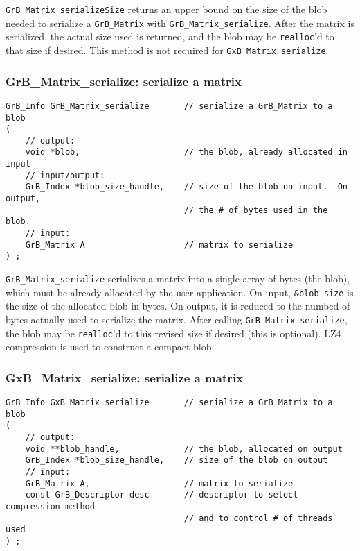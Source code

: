 \documentclass[12pt]{article}
\begin{document}
{\verb'GrB_Matrix_serializeSize' returns an upper bound on the size of the blob
needed to serialize a \verb'GrB_Matrix' with \verb'GrB_Matrix_serialize'.
After the matrix is serialized, the actual size used is returned, and the blob
may be \verb'realloc''d to that size if desired.
This method is not required for \verb'GxB_Matrix_serialize'.

\newpage
\subsubsection{{\sf GrB\_Matrix\_serialize:}      serialize a matrix}
\label{matrix_serialize}

\begin{mdframed}[userdefinedwidth=6in]
{\footnotesize
\begin{verbatim}
GrB_Info GrB_Matrix_serialize       // serialize a GrB_Matrix to a blob
(
    // output:
    void *blob,                     // the blob, already allocated in input
    // input/output:
    GrB_Index *blob_size_handle,    // size of the blob on input.  On output,
                                    // the # of bytes used in the blob.
    // input:
    GrB_Matrix A                    // matrix to serialize
) ;
\end{verbatim}
} \end{mdframed}

\verb'GrB_Matrix_serialize' serializes a matrix into a single array of bytes
(the blob), which must be already allocated by the user application.
On input, \verb'&blob_size' is the size of the allocated blob in bytes.
On output, it is reduced to the numbed of bytes actually used to serialize
the matrix.  After calling \verb'GrB_Matrix_serialize', the blob may be
\verb'realloc''d to this revised size if desired (this is optional).
LZ4 compression is used to construct a compact blob.

\subsubsection{{\sf GxB\_Matrix\_serialize:}      serialize a matrix}
\label{matrix_serialize_GxB}

\begin{mdframed}[userdefinedwidth=6in]
{\footnotesize
\begin{verbatim}
GrB_Info GxB_Matrix_serialize       // serialize a GrB_Matrix to a blob
(
    // output:
    void **blob_handle,             // the blob, allocated on output
    GrB_Index *blob_size_handle,    // size of the blob on output
    // input:
    GrB_Matrix A,                   // matrix to serialize
    const GrB_Descriptor desc       // descriptor to select compression method
                                    // and to control # of threads used
) ;
\end{verbatim}
} \end{mdframed}

}
\end{document}
